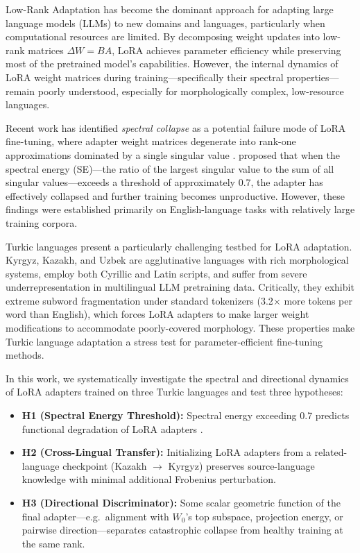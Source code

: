 \documentclass[11pt]{article}
\begin{document}
Low-Rank Adaptation \cite{hu2022lora} has become the dominant approach for adapting large language models (LLMs) to new domains and languages, particularly when computational resources are limited. By decomposing weight updates into low-rank matrices $\Delta W = BA$, LoRA achieves parameter efficiency while preserving most of the pretrained model's capabilities. However, the internal dynamics of LoRA weight matrices during training---specifically their spectral properties---remain poorly understood, especially for morphologically complex, low-resource languages.

Recent work has identified \emph{spectral collapse} as a potential failure mode of LoRA fine-tuning, where adapter weight matrices degenerate into rank-one approximations dominated by a single singular value \cite{biderman2024lora,jang2024lora}. \citet{biderman2024lora} proposed that when the spectral energy (SE)---the ratio of the largest singular value to the sum of all singular values---exceeds a threshold of approximately 0.7, the adapter has effectively collapsed and further training becomes unproductive. However, these findings were established primarily on English-language tasks with relatively large training corpora.

Turkic languages present a particularly challenging testbed for LoRA adaptation. Kyrgyz, Kazakh, and Uzbek are agglutinative languages with rich morphological systems, employ both Cyrillic and Latin scripts, and suffer from severe underrepresentation in multilingual LLM pretraining data. Critically, they exhibit extreme subword fragmentation under standard tokenizers (3.2$\times$ more tokens per word than English), which forces LoRA adapters to make larger weight modifications to accommodate poorly-covered morphology. These properties make Turkic language adaptation a stress test for parameter-efficient fine-tuning methods.

In this work, we systematically investigate the spectral and directional dynamics of LoRA adapters trained on three Turkic languages and test three hypotheses:

\begin{itemize}
    \item \textbf{H1 (Spectral Energy Threshold):} Spectral energy exceeding 0.7 predicts functional degradation of LoRA adapters \cite{biderman2024lora}.
    \item \textbf{H2 (Cross-Lingual Transfer):} Initializing LoRA adapters from a related-language checkpoint (Kazakh $\rightarrow$ Kyrgyz) preserves source-language knowledge with minimal additional Frobenius perturbation.
    \item \textbf{H3 (Directional Discriminator):} Some scalar geometric function of the final adapter---e.g.\ alignment with $W_0$'s top subspace, projection energy, or pairwise direction---separates catastrophic collapse from healthy training at the same rank.
\end{itemize}
\end{document}
